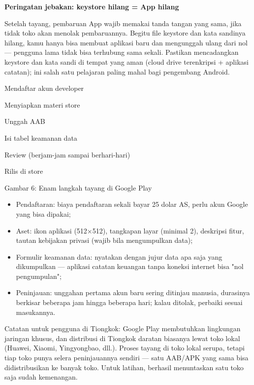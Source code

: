 \textbf{Peringatan jebakan: keystore hilang = App hilang}\par

Setelah tayang, pembaruan App wajib memakai tanda tangan yang sama, jika tidak toko akan menolak pembaruannya. Begitu file keystore dan kata sandinya hilang, kamu hanya bisa membuat aplikasi baru dan mengunggah ulang dari nol — pengguna lama tidak bisa terhubung sama sekali. Pastikan mencadangkan keystore dan kata sandi di tempat yang aman (cloud drive terenkripsi + aplikasi catatan); ini salah satu pelajaran paling mahal bagi pengembang Android.


Mendaftar akun developer

Menyiapkan materi store

Unggah AAB

Isi tabel keamanan data

Review (berjam-jam sampai berhari-hari)

Rilis di store

\begin{center}\small\color{gray}Gambar 6: Enam langkah tayang di Google Play\end{center}

\begin{itemize}
  \item Pendaftaran: biaya pendaftaran sekali bayar 25 dolar AS, perlu akun Google yang bisa dipakai;
  \item Aset: ikon aplikasi (512×512), tangkapan layar (minimal 2), deskripsi fitur, tautan kebijakan privasi (wajib bila mengumpulkan data);
  \item Formulir keamanan data: nyatakan dengan jujur data apa saja yang dikumpulkan — aplikasi catatan keuangan tanpa koneksi internet bisa "nol pengumpulan";
  \item Peninjauan: unggahan pertama akun baru sering ditinjau manusia, durasinya berkisar beberapa jam hingga beberapa hari; kalau ditolak, perbaiki sesuai masukannya.
\end{itemize}

Catatan untuk pengguna di Tiongkok: Google Play membutuhkan lingkungan jaringan khusus, dan distribusi di Tiongkok daratan biasanya lewat toko lokal (Huawei, Xiaomi, Yingyongbao, dll.). Proses tayang di toko lokal serupa, tetapi tiap toko punya selera peninjauannya sendiri — satu AAB/APK yang sama bisa didistribusikan ke banyak toko. Untuk latihan, berhasil menuntaskan satu toko saja sudah kemenangan.

